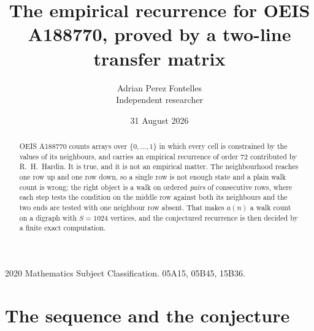 \documentclass[11pt,a4paper]{article}
\title{The empirical recurrence for OEIS A188770, proved by a two-line transfer matrix}
\author{Adrian Perez Fontelles\\ \small Independent researcher}
\date{31 August 2026}
\theoremstyle{plain}
\theoremstyle{definition}
\begin{document}
\maketitle

\begin{abstract}
OEIS A188770 counts arrays over $\{0,\dots,1\}$ in which every cell is constrained by the
values of its neighbours, and carries an empirical recurrence of order $72$ contributed
by R.~H.~Hardin. It is true, and it is not an empirical matter. The neighbourhood reaches one
row up and one row down, so a single row is not enough state and a plain walk count
is wrong; the right object is a walk on ordered \emph{pairs} of consecutive rows, where
each step tests the condition on the middle row against both its neighbours and the two
ends are tested with one neighbour row absent. That makes $a(n)$ a walk count on a digraph
with $S=1024$ vertices, and the conjectured recurrence is then decided by a finite exact
computation.
\end{abstract}

\noindent\small 2020 Mathematics Subject Classification. 05A15, 05B45, 15B36.\normalsize

\section{The sequence and the conjecture}
\end{document}
